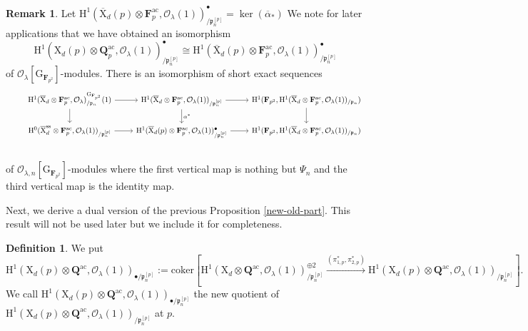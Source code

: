 \documentclass[10pt]{amsart}
\numberwithin{equation}{section}
\theoremstyle{plain}
\numberwithin{equation}{section}
\theoremstyle{definition}
\newtheorem{definition}[theorem]{Definition}
\newtheorem{remark}[equation]{Remark}
\theoremstyle{remark}
\def\ac{\mathrm{ac}}
\def\Qbar{\QQ^{\ac}}
\def\ss{\mathrm{ss}}
\def\ac{\mathrm{ac}}
\def\calO{\mathcal{O}}
\def\frakp{\mathfrak{p}}
\def\FF{\mathbf{F}}
\def\QQ{\mathbf{Q}}
\def\rmG{\mathrm{G}}
\def\rmH{\mathrm{H}}
\def\rmX{\mathrm{X}}
\begin{document}
\begin{remark}\label{special-new-part}
Let $\rmH^{1}(\overline{\rmX}_{d}(p)\otimes {\FF^{\ac}_{p}}, \calO_{\lambda}(1))^{\bullet}_{/\frakp^{[p]}_{n}}=\ker(\overline{\alpha}_{\ast})$ We note for later applications that we have obtained an isomorphism
\begin{equation*}
\rmH^{1}(\rmX_{d}(p)\otimes{\Qbar_{p}}, \calO_{\lambda}(1))^{\bullet}_{/\frakp^{[p]}_{n}}\cong \rmH^{1}(\overline{\rmX}_{d}(p)\otimes {\FF^{\ac}_{p}}, \calO_{\lambda}(1))^{\bullet}_{/\frakp^{[p]}_{n}}
\end{equation*}
of $\calO_{\lambda}[\rmG_{\FF_{p^{2}}}]$-modules. There is an isomorphism of short exact sequences 
\begin{equation*}
\begin{tikzcd}
&\rmH^{1}(\overline{\rmX}_{d}\otimes{\FF^{\ac}_{p}}, \calO_{\lambda})_{/\frakp_{n}}^{\rmG_{\FF_{p^{2}}}}(1) \arrow[r] \arrow[d]      & \rmH^{1}(\overline{\rmX}_{d}\otimes{\FF^{\ac}_{p}}, \calO_{\lambda}(1))_{/\frakp^{[p]}_{n}} \arrow[r] \arrow[d, "\alpha^{\ast}"] & \rmH^{1}(\FF_{p^{2}}, \rmH^{1}(\overline{\rmX}_{d}\otimes{\FF^{\ac}_{p}}, \calO_{\lambda}(1))_{/\frakp_{n}})\arrow[d] \\
& \rmH^{0}(\overline{\rmX}^{\ss}_{d}\otimes{\FF^{\ac}_{p}}, \calO_{\lambda}(1))_{/\frakp^{[p]}_{n}} \arrow[r] & \rmH^{1}(\overline{\rmX}_{d}(p)\otimes {\FF^{\ac}_{p}}, \calO_{\lambda}(1))^{\bullet}_{/\frakp^{[p]}_{n}}\arrow[r] & \rmH^{1}(\FF_{p^{2}}, \rmH^{1}(\overline{\rmX}_{d}\otimes{\FF^{\ac}_{p}}, \calO_{\lambda}(1))_{/\frakp_{n}})\\  
\end{tikzcd}
\end{equation*}
of $\calO_{\lambda,n}[\rmG_{\FF_{p^{2}}}]$-modules where the first vertical map is nothing but $\Psi_{n}$ and the third vertical map is the identity map.
\end{remark}

Next, we derive a dual version of the previous Proposition \ref{new-old-part}. This result will not be used later but we include it for completeness. 
\begin{definition}
We put  
\begin{equation*}
\rmH^{1}(\rmX_{d}(p)\otimes{\Qbar}, \calO_{\lambda}(1))_{\bullet/\frakp^{[p]}_{n}}:=\mathrm{coker}[\rmH^{1}(\rmX_{d}\otimes {\Qbar}, \calO_{\lambda}(1))^{\oplus 2}_{/\frakp^{[p]}_{n}}\xrightarrow{(\pi^{\ast}_{1,p}, \pi^{\ast}_{2,p})}\rmH^{1}(\rmX_{d}(p)\otimes{\Qbar}, \calO_{\lambda}(1))_{/\frakp^{[p]}_{n}}].
\end{equation*}
We call $\rmH^{1}(\rmX_{d}(p)\otimes{\Qbar}, \calO_{\lambda}(1))_{\bullet/\frakp^{[p]}_{n}}$ the {new quotient}
of  $\rmH^{1}(\rmX_{d}(p)\otimes{\Qbar}, \calO_{\lambda}(1))_{/\frakp^{[p]}_{n}}$ at $p$.
\end{definition}
\end{document}
